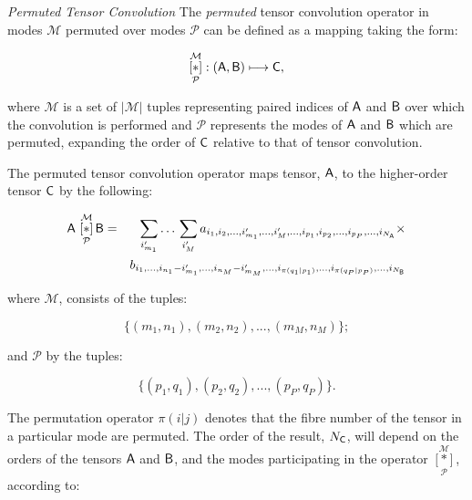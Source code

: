 \begin{definition}{\textit{Permuted Tensor Convolution}} \label{def:permconvop} The \textit{permuted} tensor convolution operator in modes $\mathcal{M}$ permuted over modes $\mathcal{P}$ can be defined as a mapping taking the form:

\begin{equation}
 \underset{\mathcal{P}}{\overset{\mathcal{M}}{[ \ast ]}}: \left (\mathsf{A},\mathsf{B}  \right ) \longmapsto \mathsf{C},
 \end{equation}
 
 where $\mathcal{M}$ is a set of $|\mathcal{M}|$ tuples representing paired indices of $\mathsf{A}$ and $\mathsf{B}$ over which the convolution is performed and $\mathcal{P}$ represents the modes of $\mathsf{A}$ and $\mathsf{B}$ which are permuted, expanding the order of $\mathsf{C}$ relative to that of tensor convolution.

The permuted tensor convolution operator maps tensor, $\mathsf{A}$, to the higher-order tensor $\mathsf{C}$ by the following:

\begin{eqnarray}
\mathsf{A}\,\,\underset{\mathcal{P}}{\overset{\mathcal{M}}{[ \ast ]}}\, {\mathsf{B}} &=& \sum_{i'_{m_1}}\ldots\,\sum_{i_{M}'}  a_{i_1,i_2,...,i_{m_1}',...,i_{M}',...,i_{p_1},i_{p_2},...,i_{p_P},...,i_{N_{\mathsf{A}}}} \times \nonumber \\
 & &b_{i_1,...,i_{n_1}-i_{m_1}',...,i_{n_M}-i_{m_M}',...,i_{\pi(q_1|p_1)},...,i_{\pi(q_P|p_P)},...,i_{N_{\mathsf{B}}}}
\label{eq:t2}
\end{eqnarray}

where $\mathcal{M}$, consists of the tuples:

\begin{equation}
\lbrace(m_1,n_1),(m_2,n_2),...,(m_{M},n_{M})\rbrace;
\end{equation}

and $\mathcal{P}$ by the tuples:

\begin{equation}
\lbrace(p_1,q_1),(p_2,q_2),...,(p_{P},q_{P})\rbrace.
\end{equation}

The permutation operator $\pi(i|j)$ denotes that the fibre number of the tensor in a particular mode are permuted.  The order of the result, $N_{\mathsf{C}}$, will depend on the orders of the tensors $\mathsf{A}$ and $\mathsf{B}$, and the modes participating in the operator $\underset{\mathcal{P}}{\overset{\mathcal{M}}{[ \ast ]}}$, according to:


\end{definition}
